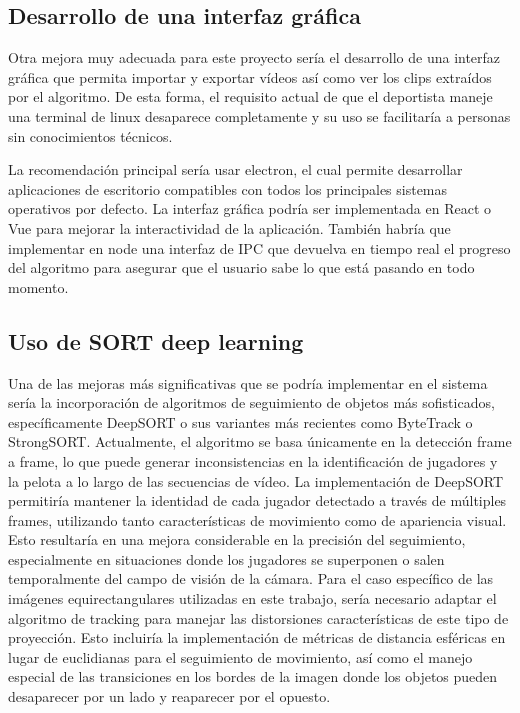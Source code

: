 \subsection{Desarrollo de una interfaz gráfica}
Otra mejora muy adecuada para este proyecto sería el desarrollo de una interfaz gráfica que permita importar y exportar vídeos así como ver los clips extraídos por el algoritmo. De esta forma, el requisito actual de que el deportista maneje una terminal de linux desaparece completamente y su uso se facilitaría a personas sin conocimientos técnicos.

La recomendación principal sería usar electron, el cual permite desarrollar aplicaciones de escritorio compatibles con todos los principales sistemas operativos por defecto. La interfaz gráfica podría ser implementada en React o Vue para mejorar la interactividad de la aplicación. También habría que implementar en node una interfaz de IPC que devuelva en tiempo real el progreso del algoritmo para asegurar que el usuario sabe lo que está pasando en todo momento.

\subsection{Uso de SORT deep learning}
Una de las mejoras más significativas que se podría implementar en el sistema sería la incorporación de algoritmos de seguimiento de objetos más sofisticados, específicamente DeepSORT o sus variantes más recientes como ByteTrack o StrongSORT. Actualmente, el algoritmo se basa únicamente en la detección frame a frame, lo que puede generar inconsistencias en la identificación de jugadores y la pelota a lo largo de las secuencias de vídeo.
La implementación de DeepSORT permitiría mantener la identidad de cada jugador detectado a través de múltiples frames, utilizando tanto características de movimiento como de apariencia visual. Esto resultaría en una mejora considerable en la precisión del seguimiento, especialmente en situaciones donde los jugadores se superponen o salen temporalmente del campo de visión de la cámara.
Para el caso específico de las imágenes equirectangulares utilizadas en este trabajo, sería necesario adaptar el algoritmo de tracking para manejar las distorsiones características de este tipo de proyección. Esto incluiría la implementación de métricas de distancia esféricas en lugar de euclidianas para el seguimiento de movimiento, así como el manejo especial de las transiciones en los bordes de la imagen donde los objetos pueden desaparecer por un lado y reaparecer por el opuesto.

